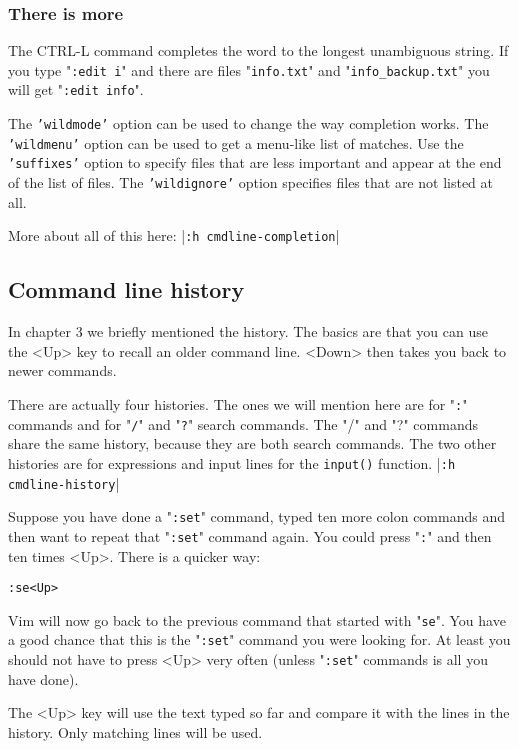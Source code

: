 \subsubsection{There is more}
The CTRL-L command completes the word to the longest unambiguous string.
If you type "\texttt{:edit i}" and there are files "\texttt{info.txt}" and "\texttt{info\_backup.txt}" you will get "\texttt{:edit info}".

The \texttt{'wildmode'} option can be used to change the way completion works.
The \texttt{'wildmenu'} option can be used to get a menu-like list of matches.
Use the \texttt{'suffixes'} option to specify files that are less important and appear at the end of the list of files.
The \texttt{'wildignore'} option specifies files that are not listed at all.

More about all of this here: |\texttt{:h cmdline-completion}|
\subsection{Command line history}
In chapter 3 we briefly mentioned the history.
The basics are that you can use the <Up> key to recall an older command line.
<Down> then takes you back to newer commands.

There are actually four histories.
The ones we will mention here are for "\texttt{:}" commands and for "\texttt{/}" and "\texttt{?}" search commands.
The "/" and "?" commands share the same history, because they are both search commands.
The two other histories are for expressions and input lines for the \texttt{input()} function.
|\texttt{:h cmdline-history}|

Suppose you have done a "\texttt{:set}" command, typed ten more colon commands and then want to repeat that "\texttt{:set}" command again.
You could press "\texttt{:}" and then ten times <Up>.
There is a quicker way:

\begin{Verbatim}[samepage=true]
 :se<Up>
\end{Verbatim}

Vim will now go back to the previous command that started with "\texttt{se}".
You have a good chance that this is the "\texttt{:set}" command you were looking for.
At least you should not have to press <Up> very often (unless "\texttt{:set}" commands is all you have done).

The <Up> key will use the text typed so far and compare it with the lines in the history.
Only matching lines will be used.


